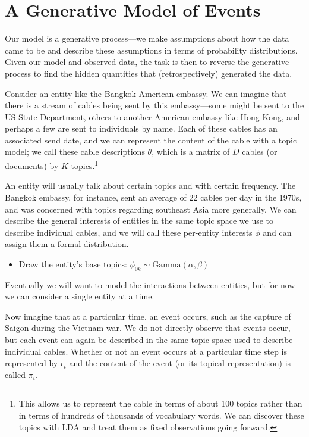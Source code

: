 \section{A Generative Model of Events}
Our model is a generative process---we make assumptions about how the data came to be and describe these assumptions in terms of probability distributions.  Given our model and observed data, the task is then to reverse the generative process to find the hidden quantities that (retrospectively) generated the data.

Consider an entity like the Bangkok American embassy.  We can imagine that there is a stream of cables being sent by this embassy---some might be sent to the US State Department, others to another American embassy like Hong Kong, and perhaps a few are sent to individuals by name.  Each of these cables has an associated send date, and we can represent the content of the cable with a topic model; we call these cable descriptions $\theta$, which is a matrix of $D$ cables (or documents) by $K$ topics.\footnote{This allows us to represent the cable in terms of about 100 topics rather than in terms of hundreds of thousands of vocabulary words. We can discover these topics with LDA and treat them as fixed observations going forward.}

An entity will usually talk about certain topics and with certain frequency. The Bangkok embassy, for instance, sent an average of 22 cables per day in the 1970s, and was concerned with topics regarding southeast Asia more generally.  We can describe the general interests of entities in the same topic space we use to describe individual cables, and we will call these per-entity interests $\phi$ and can assign them a formal distribution.
\begin{itemize}
\item Draw the entity's base topics: $\phi_{0k} \sim \mbox{Gamma}(\alpha, \beta)$
\end{itemize}
Eventually we will want to model the interactions between entities, but for now we can consider a single entity at a time.

Now imagine that at a particular time, an event occurs, such as the capture of Saigon during the Vietnam war.  We do not directly observe that events occur, but each event can again be described in the same topic space used to describe individual cables.  Whether or not an event occurs at a particular time step is represented by $\epsilon_t$ and the content of the event (or its topical representation) is called $\pi_t$.

